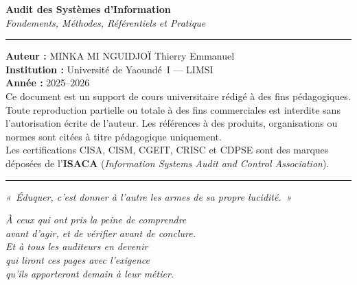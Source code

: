\documentclass[12pt, a4paper, twoside, openany]{book}
\begin{document}
\begin{center}
    \begin{minipage}{0.78\textwidth}
        \footnotesize\color{CouleurBordInfo}
        \begin{center}
            {\bfseries\color{CouleurPrimaire}
                Audit des Systèmes d'Information}\\[0.4ex]
            {\itshape Fondements, Méthodes, Référentiels et Pratique}
        \end{center}
        \vspace{0.8ex}
        \hrule
        \vspace{0.8ex}
        \textbf{Auteur :} MINKA MI NGUIDJOÏ Thierry Emmanuel\\
        \textbf{Institution :} Université de Yaoundé~I — LIMSI\\
        \textbf{Année :} 2025--2026\\[0.5ex]
        Ce document est un support de cours universitaire rédigé à des fins
        pédagogiques. Toute reproduction partielle ou totale à des fins commerciales
        est interdite sans l'autorisation écrite de l'auteur. Les références à des
        produits, organisations ou normes sont citées à titre pédagogique uniquement.\\[0.5ex]
        Les certifications CISA, CISM, CGEIT, CRISC et CDPSE sont des marques
        déposées de l'\textbf{ISACA} (\textit{Information Systems Audit and Control Association}).\\[0.5ex]
        
        \hrule
        \vspace{0.5ex}
        {\centering\itshape
        «~Éduquer, c'est donner à l'autre les armes de sa propre lucidité.~»}
    \end{minipage}
\end{center}

\vspace*{\fill}

\clearpage
\thispagestyle{empty}
\vspace*{3cm}
\begin{flushright}
    \begin{minipage}{0.6\textwidth}
        \itshape\large\color{CouleurPrimaire}
        À ceux qui ont pris la peine de comprendre\\
        avant d'agir, et de vérifier avant de conclure.\\[1.5ex]
        \normalsize\normalfont\color{CouleurAccent}
        Et à tous les auditeurs en devenir\\
        qui liront ces pages avec l'exigence\\
        qu'ils apporteront demain à leur métier.
    \end{minipage}
\end{flushright}
\end{document}
